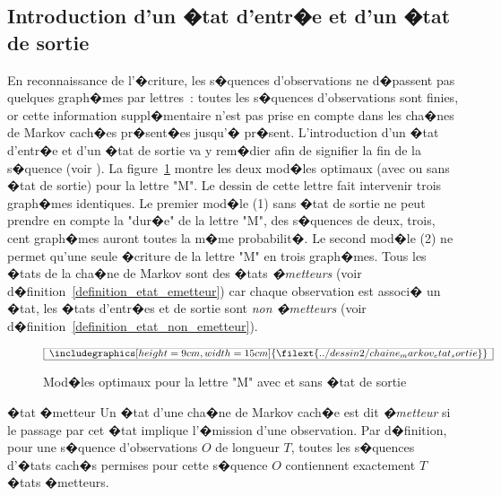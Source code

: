 \subsection{Introduction d'un �tat d'entr�e et d'un �tat de sortie}

\label{hmm_intro_entree_sortie}

En reconnaissance de l'�criture, les s�quences d'observations ne d�passent pas quelques graph�mes par lettres~: toutes les s�quences d'observations sont finies, or cette information suppl�mentaire n'est pas prise en compte dans les cha�nes de Markov cach�es pr�sent�es jusqu'� pr�sent. L'introduction d'un �tat d'entr�e et d'un �tat de sortie va y rem�dier afin de signifier la fin de la s�quence (voir ). La figure~\ref{figure_model_optimaux_M-fig} montre les deux mod�les optimaux (avec ou sans �tat de sortie) pour la lettre "M". Le dessin de cette lettre fait intervenir trois graph�mes identiques. Le premier mod�le (1) sans �tat de sortie ne peut prendre en compte la "dur�e" de la lettre "M", des s�quences de deux, trois, cent graph�mes auront toutes la m�me probabilit�. Le second mod�le (2) ne permet qu'une seule �criture de la lettre "M" en trois graph�mes. Tous les �tats de la cha�ne de Markov sont des �tats \emph{�metteurs} (voir d�finition~\ref{definition_etat_emetteur}) car chaque observation est associ� un �tat, les �tats d'entr�es et de sortie sont \emph{non �metteurs} (voir d�finition~\ref{definition_etat_non_emetteur}).

        \begin{figure}[t]
    $$\frame{$\begin{array}[c|c]{c}\includegraphics[height=9cm, width=15cm] 
    {\filext{../dessin2/chaine_markov_etat_sortie}}\end{array}$}$$
    \caption{Mod�les optimaux pour la lettre "M" avec et sans �tat de sortie}
    \label{figure_model_optimaux_M-fig}
        \end{figure}




        \begin{xdefinition}{�tat �metteur}
        \label{definition_etat_emetteur}%
        Un �tat d'une cha�ne de Markov cach�e est dit \emph{�metteur} si le passage par cet �tat implique 
        l'�mission d'une observation. Par d�finition, pour une s�quence d'observations $O$ de longueur $T$, 
        toutes les s�quences d'�tats cach�s permises pour cette s�quence $O$ contiennent exactement $T$ �tats �metteurs.
        \end{xdefinition}


